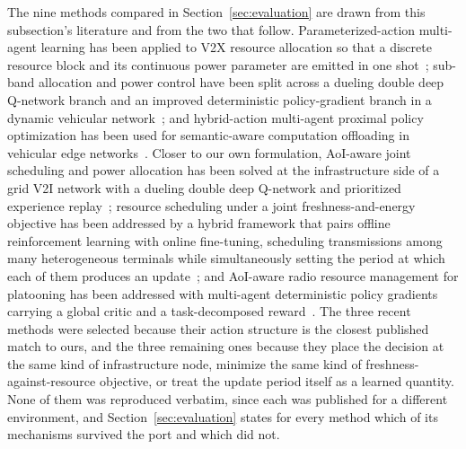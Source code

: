 \documentclass[journal]{IEEEtran}
\begin{document}
The nine methods compared in Section~\ref{sec:evaluation} are drawn from this subsection's literature and from the two that follow. Parameterized-action multi-agent learning has been applied to V2X resource allocation so that a discrete resource block and its continuous power parameter are emitted in one shot~\cite{li2026}; sub-band allocation and power control have been split across a dueling double deep Q-network branch and an improved deterministic policy-gradient branch in a dynamic vehicular network~\cite{hong2026}; and hybrid-action multi-agent proximal policy optimization has been used for semantic-aware computation offloading in vehicular edge networks~\cite{chen2026}. Closer to our own formulation, AoI-aware joint scheduling and power allocation has been solved at the infrastructure side of a grid V2I network with a dueling double deep Q-network and prioritized experience replay~\cite{bai2024}; resource scheduling under a joint freshness-and-energy objective has been addressed by a hybrid framework that pairs offline reinforcement learning with online fine-tuning, scheduling transmissions among many heterogeneous terminals while simultaneously setting the period at which each of them produces an update~\cite{xu2026}; and AoI-aware radio resource management for platooning has been addressed with multi-agent deterministic policy gradients carrying a global critic and a task-decomposed reward~\cite{parvini2023}. The three recent methods were selected because their action structure is the closest published match to ours, and the three remaining ones because they place the decision at the same kind of infrastructure node, minimize the same kind of freshness-against-resource objective, or treat the update period itself as a learned quantity. None of them was reproduced verbatim, since each was published for a different environment, and Section~\ref{sec:evaluation} states for every method which of its mechanisms survived the port and which did not.
\end{document}
